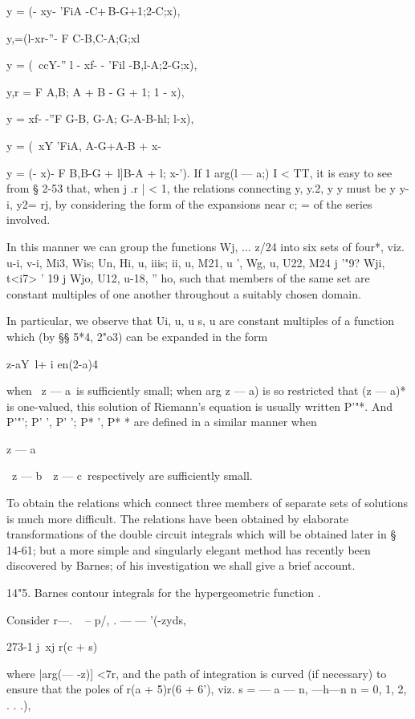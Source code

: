 y = (- xy- 'FiA -C+\,B-G+1;2-C;x),

y,=(l-xr-''- F C-B,C-A;G;xl

y = (\ ccY-'' l - xf- - 'Fil -B,l-A;2-G;x),

y,r = F A,B; A + B - G + 1; 1 - x),

y = xf- -''F G-B, G-A; G-A-B-hl; l-x),

y = (\ xY 'FiA, A-G+\;A-B + \; x-%

y = (- x)- F B,B-G + l]B-A + l; x-'). If 1 arg(l — a;) I < TT, it is
easy to see from § 2-53 that, when j .r | < 1, the relations
connecting y, y.2, y y must be y y-i, y2= rj, by considering the
form of the expansions near c; = of the series involved.

In this manner we can group the functions Wj, ... z/24 into six sets
of four*, viz. u-i, v-i, Mi3, Wis; Un, Hi, u, iiis; ii, u, M21, u
', Wg, u, U22, M24 j '"9? Wji, t<i7> ' 19 j Wjo, U12, u-18, '' ho,
such that members of the same set are constant multiples of one
another throughout a suitably chosen domain.

In particular, we observe that Ui, u, u s, u are constant multiples
of a function which (by §§ 5*4, 2"o3) can be expanded in the form

 z-aY\ l+ i en(2-a)4

when \ z — a\ is sufficiently small; when arg z — a) is so restricted
that (z — a)* is one-valued, this solution of Riemann's equation is
usually written P'"*. And P'"'; P' ', P' '; P* ', P* * are defined in
a similar manner when

z — a

\ z — b\, \ z — c\ respectively are sufficiently small.

To obtain the relations which connect three members of separate sets
of solutions is much more difficult. The relations have been obtained
by elaborate transformations of the double circuit integrals which
will be obtained later in § 14-61; but a more simple and singularly
elegant method has recently been discovered by Barnes; of his
investigation we shall give a brief account.

14"5. Barnes contour integrals for the hypergeometric function .

Consider r—. ~ -- p/, . — — '(-zyds,

273-1 j\ xj r(c + s)

where |arg(— -z)] <7r, and the path of integration is curved (if
necessary) to ensure that the poles of r(a + 5)r(6 + 6'), viz. s = — a
— n, —h—n n = 0, 1, 2, . . .),

